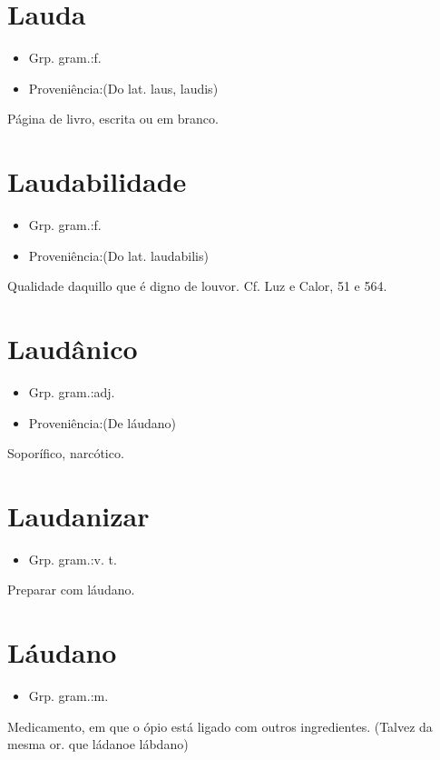 \section{Lauda}
\begin{itemize}
\item {Grp. gram.:f.}
\end{itemize}
\begin{itemize}
\item {Proveniência:(Do lat. \textunderscore laus\textunderscore , \textunderscore laudis\textunderscore )}
\end{itemize}
Página de livro, escrita ou em branco.
\section{Laudabilidade}
\begin{itemize}
\item {Grp. gram.:f.}
\end{itemize}
\begin{itemize}
\item {Proveniência:(Do lat. \textunderscore laudabilis\textunderscore )}
\end{itemize}
Qualidade daquillo que é digno de louvor. Cf. \textunderscore Luz e Calor\textunderscore , 51 e 564.
\section{Laudânico}
\begin{itemize}
\item {Grp. gram.:adj.}
\end{itemize}
\begin{itemize}
\item {Proveniência:(De \textunderscore láudano\textunderscore )}
\end{itemize}
Soporífico, narcótico.
\section{Laudanizar}
\begin{itemize}
\item {Grp. gram.:v. t.}
\end{itemize}
Preparar com láudano.
\section{Láudano}
\begin{itemize}
\item {Grp. gram.:m.}
\end{itemize}
Medicamento, em que o ópio está ligado com outros ingredientes.
(Talvez da mesma or. que \textunderscore ládano\textunderscore  e \textunderscore lábdano\textunderscore )
